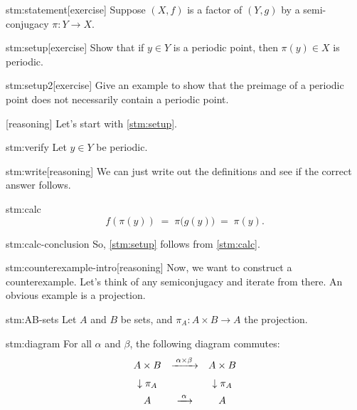 \documentclass{article}
\begin{document}

\begin{stm}{stm:statement}[exercise]
Suppose $(X,f)$ is a factor of $(Y,g)$ by a semi-conjugacy $\pi\colon Y \to X$.
\end{stm}

\begin{stm}{stm:setup}[exercise]
Show that if $y \in Y$ is a periodic point, then $\pi(y) \in X$ is periodic.
\end{stm}

\begin{stm}{stm:setup2}[exercise]
Give an example to show that the preimage of a periodic point does not necessarily contain a periodic point.
\end{stm}


\begin{stm}{}[reasoning]
Let's start with \ref{stm:setup}.
\end{stm}

\begin{stm}{stm:verify}
Let $y \in Y$ be periodic.
\end{stm}

\begin{stm}{stm:write}[reasoning]
We can just write out the definitions and see if the correct answer follows.
\end{stm}

\begin{stm}{stm:calc}
$$
f(\pi(y)) \;=\; \pi\bigl(g(y)\bigr) \;=\; \pi(y).
$$
\end{stm}

\begin{stm}{stm:calc-conclusion}
So, \ref{stm:setup} follows from \ref{stm:calc}.
\end{stm}

\begin{stm}{stm:counterexample-intro}[reasoning]
Now, we want to construct a counterexample. Let's think of any semiconjugacy and iterate from there. An obvious example is a projection.
\end{stm}

\begin{stm}{stm:AB-sets}
Let $A$ and $B$ be sets, and $\pi_A\colon A \times B \to A$ the projection.
\end{stm}

\begin{stm}{stm:diagram}
For all $\alpha$ and $\beta$, the following diagram commutes:
\[
\begin{array}{c@{\quad}c@{\quad}c}
A \times B & \xrightarrow{\;\alpha \times \beta\;} & A \times B\\[6pt]
\downarrow{\pi_A} && \downarrow{\pi_A}\\[4pt]
A & \xrightarrow{\;\alpha\;} & A
\end{array}
\]
\end{stm}
\end{document}
